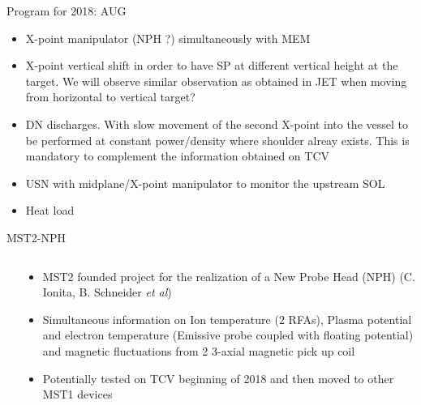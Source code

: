 \documentclass[10pt, compress]{beamer}
\begin{document}
\begin{frame}{Program for 2018: AUG}
  \begin{itemize}
     \item X-point manipulator (NPH ?) simultaneously with MEM
     \item X-point vertical shift in order to have SP at different
	vertical height at the target. \alert{We will observe similar
          observation as obtained in JET when moving from horizontal
          to vertical target?}
     \item DN discharges. With slow movement of the second X-point into the vessel
	to be performed at constant power/density where shoulder
        alreay exists. \alert{This is mandatory to complement the
          information obtained on TCV}
     \item USN with midplane/X-point manipulator to monitor the
       upstream SOL 
     \item Heat load
\end{itemize}
 \end{frame}
 \begin{frame}{MST2-NPH}
   \begin{columns}
     \begin{column}{0.5\textwidth}
     \end{column}
     \begin{column}{0.5\textwidth}
       \begin{itemize}
         \item MST2 founded project for the realization of a New Probe
           Head (NPH) (C. Ionita,  B. Schneider \textit{et al})
         \item Simultaneous information on Ion temperature (2 RFAs),
           Plasma potential and electron temperature (Emissive probe
           coupled with floating potential) and magnetic fluctuations
           from 2 3-axial magnetic pick up coil
         \item Potentially tested on TCV beginning of 2018 and then
           moved to other MST1 devices
       \end{itemize}
     \end{column}
   \end{columns}
 \end{frame}
 
\end{document}
